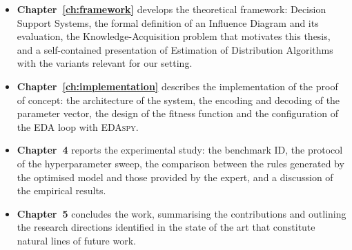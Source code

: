 \begin{itemize}
    \item \textbf{Chapter~\ref{ch:framework}} develops the
          theoretical framework: Decision Support Systems, the
          formal definition of an Influence Diagram and its
          evaluation, the Knowledge-Acquisition problem that
          motivates this thesis, and a self-contained presentation
          of Estimation of Distribution Algorithms with the variants
          relevant for our setting.
    \item \textbf{Chapter~\ref{ch:implementation}} describes the
          implementation of the proof of concept: the architecture
          of the system, the encoding and decoding of the parameter
          vector, the design of the fitness function and the
          configuration of the EDA loop with \textsc{EDAspy}.
    \item \textbf{Chapter~4} reports the experimental study: the
          benchmark ID, the protocol of the hyperparameter sweep,
          the comparison between the rules generated by the
          optimised model and those provided by the expert, and a
          discussion of the empirical results.
    \item \textbf{Chapter~5} concludes the work, summarising the
          contributions and outlining the research directions
          identified in the state of the art that constitute
          natural lines of future work.
\end{itemize}
